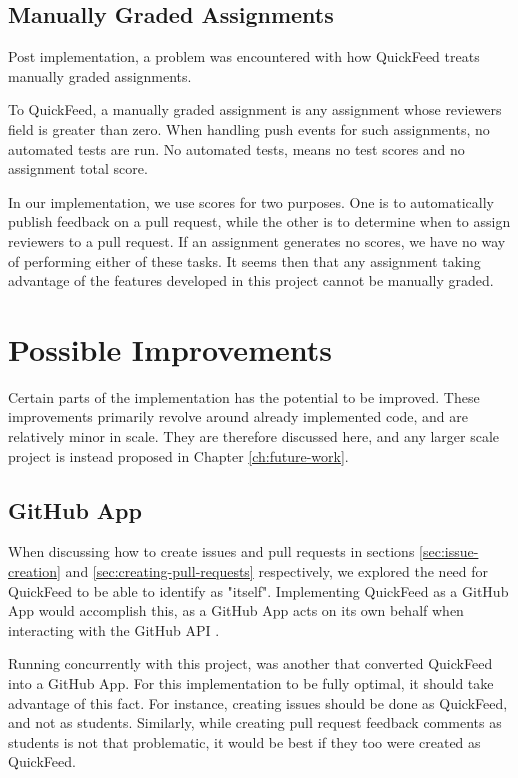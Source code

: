\subsection{Manually Graded Assignments}

Post implementation, a problem was encountered with how QuickFeed treats manually graded assignments.

To QuickFeed, a manually graded assignment is any assignment whose reviewers field is greater than zero.
When handling push events for such assignments, no automated tests are run.
No automated tests, means no test scores and no assignment total score.

In our implementation, we use scores for two purposes.
One is to automatically publish feedback on a pull request, while the other is to determine when to assign reviewers to a pull request.
If an assignment generates no scores, we have no way of performing either of these tasks.
It seems then that any assignment taking advantage of the features developed in this project cannot be manually graded.

\section{Possible Improvements}

Certain parts of the implementation has the potential to be improved.
These improvements primarily revolve around already implemented code, and are relatively minor in scale.
They are therefore discussed here, and any larger scale project is instead proposed in Chapter \ref{ch:future-work}.

\subsection{GitHub App}
\label{section:github-app}

When discussing how to create issues and pull requests in sections \ref{sec:issue-creation} and \ref{sec:creating-pull-requests} respectively, we explored the need for QuickFeed to be able to identify as "itself".
Implementing QuickFeed as a GitHub App would accomplish this, as a GitHub App acts on its own behalf when interacting with the GitHub API \cite{apps}.

Running concurrently with this project, was another that converted QuickFeed into a GitHub App.
For this implementation to be fully optimal, it should take advantage of this fact.
For instance, creating issues should be done as QuickFeed, and not as students.
Similarly, while creating pull request feedback comments as students is not that problematic, it would be best if they too were created as QuickFeed.

